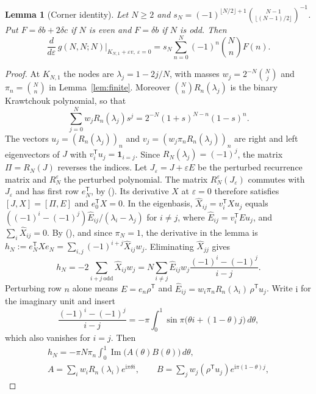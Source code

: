 \documentclass[twoside,10pt]{article}
\numberwithin{equation}{section}
\theoremstyle{slbody}
\newtheorem{lemma}[theorem]{Lemma}
\theoremstyle{definition}
\theoremstyle{remark}
\renewcommand{\eqref}[1]{\textup{{\normalfont(\oldstylenums{\ref{#1}}}\normalfont)}}
\begin{document}
\begin{lemma}[Corner identity]\label{lem:corner}
Let $N\geq2$ and $s_N=(-1)^{\lfloor N/2\rfloor+1}\binom{N-1}{\lfloor(N-1)/2\rfloor}^{-1}$. Put $F=\delta b+2\delta c$ if $N$ is even and $F=\delta b$ if $N$ is odd. Then
\[
\frac{d}{d\varepsilon}\,g(N,N;N)\Big|_{K_{N,1}+\varepsilon v,\ \varepsilon=0}=s_N\sum_{n=0}^N(-1)^n\binom NnF(n).
\]
\end{lemma}
\begin{proof}
At $K_{N,1}$ the nodes are $\lambda_j=1-2j/N$, with masses $w_j=2^{-N}\binom Nj$ and $\pi_n=\binom Nn$ in Lemma~\ref{lem:finite}. Moreover $\binom Nn R_n(\lambda_j)$ is the binary Krawtchouk polynomial, so that
\begin{equation}\label{eq:kraw-gf}
\sum_{j=0}^N w_jR_n(\lambda_j)s^j=2^{-N}(1+s)^{N-n}(1-s)^n.
\end{equation}
The vectors $u_j=(R_n(\lambda_j))_n$ and $v_j=(w_j\pi_nR_n(\lambda_j))_n$ are right and left eigenvectors of $J$ with $v_i^\mathsf Tu_j=\boldsymbol1_{i=j}$. Since $R_N(\lambda_j)=(-1)^j$, the matrix $\Pi=R_N(J)$ reverses the indices. Let $J_\varepsilon=J+\varepsilon E$ be the perturbed recurrence matrix and $R_N^\varepsilon$ the perturbed polynomial. The matrix $R_N^\varepsilon(J_\varepsilon)$ commutes with $J_\varepsilon$ and has first row $e_N^\mathsf T$, by \eqref{eq:matrix-product}. Its derivative $X$ at $\varepsilon=0$ therefore satisfies $[J,X]=[\Pi,E]$ and $e_0^\mathsf TX=0$. In the eigenbasis, $\widehat X_{ij}=v_i^\mathsf TXu_j$ equals $((-1)^i-(-1)^j)\widehat E_{ij}/(\lambda_i-\lambda_j)$ for $i\neq j$, where $\widehat E_{ij}=v_i^\mathsf TEu_j$, and $\sum_i\widehat X_{ij}=0$. By \eqref{eq:matrix-product}, and since $\pi_N=1$, the derivative in the lemma is $h_N:=e_N^\mathsf TXe_N=\sum_{i,j}(-1)^{i+j}\widehat X_{ij}w_j$. Eliminating $\widehat X_{jj}$ gives
\[
h_N=-2\sum_{i+j\ \mathrm{odd}}\widehat X_{ij}w_j=N\sum_{i\neq j}\widehat E_{ij}w_j\frac{(-1)^i-(-1)^j}{i-j}.
\]
Perturbing row $n$ alone means $E=e_n\rho^\mathsf T$ and $\widehat E_{ij}=w_i\pi_nR_n(\lambda_i)\,\rho^\mathsf Tu_j$. Write $\mathrm i$ for the imaginary unit and insert
\[
\frac{(-1)^i-(-1)^j}{i-j}=-\pi\int_0^1\sin\pi\bigl(\theta i+(1-\theta)j\bigr)\,d\theta,
\]
which also vanishes for $i=j$. Then
\begin{gather*}
h_N=-\pi N\pi_n\int_0^1\operatorname{Im}\bigl(A(\theta)B(\theta)\bigr)\,d\theta,\\
A=\sum_iw_iR_n(\lambda_i)e^{\mathrm i\pi\theta i},\qquad
B=\sum_jw_j(\rho^\mathsf Tu_j)e^{\mathrm i\pi(1-\theta)j},
\end{gather*}

\end{proof}
\end{document}
